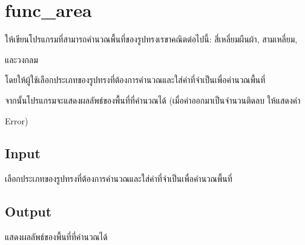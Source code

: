 \documentclass{article}
\begin{document}
\section*{func_area}

ให้เขียนโปรแกรมที่สามารถคำนวณพื้นที่ของรูปทรงเรขาคณิตต่อไปนี้: สี่เหลี่ยมผืนผ้า, สามเหลี่ยม,

และวงกลม



โดยให้ผู้ใช้เลือกประเภทของรูปทรงที่ต้องการคำนวณและใส่ค่าที่จำเป็นเพื่อคำนวณพื้นที่



จากนั้นโปรแกรมจะแสดงผลลัพธ์ของพื้นที่ที่คำนวณได้ (เมื่อค่าออกมาเป็นจำนวนติดลบ ให้แสดงค่า

Error)



\subsection*{Input}
เลือก{ประเภทของรูปทรงที่ต้องการคำนวณและใส่ค่าที่จำเป็นเพื่อคำนวณพื้นที่}



\subsection*{Output}
{แสดงผลลัพธ์ของพื้นที่ที่คำนวณได้}\\
\end{document}
